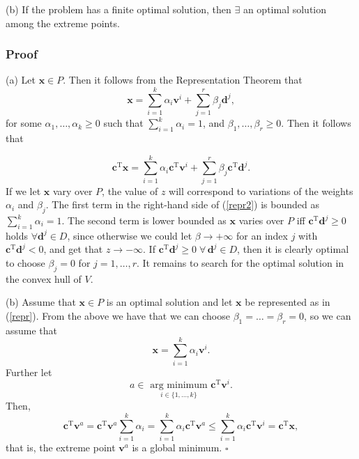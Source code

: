 \documentclass[12pt, a4paper]{article}
\begin{document}
(b) If the problem has a finite optimal solution, then $\exists$ an optimal solution among the extreme points.
\subsubsection*{Proof}
(a) Let $\bm{x}\in P$. Then it follows from the Representation Theorem that
\begin{equation}
\label{repr}
\bm{x} = \sum_{i=1}^k \alpha_i \bm{v}^i + \sum_{j=1}^r \beta_j \bm{d}^j,
\end{equation}
for some $\alpha_1,\dots,\alpha_k\geq 0$ such that $\sum_{i=1}^k \alpha_i = 1$, and $\beta_1,\dots,\beta_r\geq 0$. Then it follows that

\begin{equation}
\label{repr2}
\bm{c}^{\text{T}}\bm{x} = \sum_{i=1}^k \alpha_i \bm{c}^{\text{T}}\bm{v}^i + \sum_{j=1}^r \beta_j \bm{c}^{\text{T}}\bm{d}^j.
\end{equation}
If we let $\bm{x}$ vary over $P$, the value of $z$ will correspond to variations of the weights $\alpha_i$ and $\beta_j$. The first term in the right-hand side of (\ref{repr2}) is bounded as $\sum_{i=1}^k \alpha_i = 1$. The second term is lower bounded as $\bm{x}$ varies over $P$ iff $\bm{c}^{\text{T}}\bm{d}^j \geq 0$ holds $\forall \bm{d}^j \in D$, since otherwise we could let $\beta \rightarrow +\infty$ for an index $j$ with $\bm{c}^{\text{T}}\bm{d}^j<0$, and get that $z\rightarrow -\infty$. If $\bm{c}^{\text{T}}\bm{d}^j\geq 0\; \forall \, \bm{d}^j \in D$, then it is clearly optimal to choose $\beta_j=0$ for $j=1,\dots,r$. It remains to search for the optimal solution in the convex hull of $V$.

(b) Assume that $\bm{x}\in P$ is an optimal solution and let $\bm{x}$ be represented as in (\ref{repr}). From the above we have that we can choose $\beta_1=\dots =\beta_r = 0$, so we can assume that
\begin{equation*}
\bm{x} = \sum_{i=1}^k \alpha_i \bm{v}^i.
\end{equation*}
Further let 
\begin{equation*}
a \in \underset{i\in\{ 1,\dots,k \}}{\text{ arg minimum }} \bm{c}^{\text{T}}\bm{v}^i.
\end{equation*}
Then,
\begin{equation*}
\bm{c}^{\text{T}}\bm{v}^a = \bm{c}^{\text{T}}\bm{v}^a \sum_{i=1}^k \alpha_i = \sum_{i=1}^k \alpha_i \bm{c}^{\text{T}}\bm{v}^a \leq \sum_{i=1}^k \alpha_i \bm{c}^{\text{T}}\bm{v}^i = \bm{c}^{\text{T}}\bm{x},
\end{equation*}
that is, the extreme point $\bm{v}^a$ is a global minimum. $\square$
\end{document}
